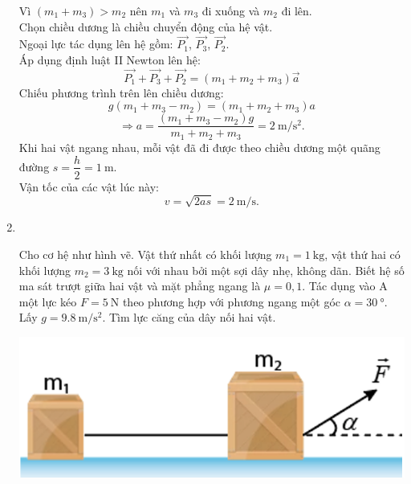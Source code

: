 \begin{enumerate}[label=\bfseries Bài \arabic*:]
{\begin{center}
\end{center}
Vì $\left(m_1+m_3\right)>m_2$ nên $m_1$ và $m_3$ đi xuống và $m_2$ đi lên.\\
Chọn chiều dương là chiều chuyển động của hệ vật.\\
Ngoại lực tác dụng lên hệ gồm: $\overrightarrow{P_1}$, $\overrightarrow{P_3}$, $\overrightarrow{P_2}$.\\
Áp dụng định luật II Newton lên hệ:
$$\overrightarrow{P_1}+\overrightarrow{P_3}+\overrightarrow{P_2}=\left(m_1+m_2+m_3\right)\vec{a}$$
Chiếu phương trình trên lên chiều dương:
$$g\left(m_1+m_3-m_2\right)=\left(m_1+m_2+m_3\right)a$$
$$\Rightarrow a=\dfrac{\left(m_1+m_3-m_2\right)g}{m_1+m_2+m_3}=\SI{2}{\meter/\second^2}.$$
Khi hai vật ngang nhau, mỗi vật đã đi được theo chiều dương một quãng đường $s=\dfrac{h}{2}=\SI{1}{\meter}$.\\
Vận tốc của các vật lúc này: 
$$v=\sqrt{2as}=\SI{2}{\meter/\second}.$$
}

\item{}\\
{Cho cơ hệ như hình vẽ. Vật thứ nhất có khối lượng $m_1=\SI{1}{\kilogram}$, vật thứ hai có khối lượng $m_2=\SI{3}{\kilogram}$ nối với nhau bởi một sợi dây nhẹ, không dãn. Biết hệ số ma sát trượt giữa hai vật và mặt phẳng ngang là $\mu=0,1$. Tác dụng vào A một lực kéo $F=\SI{5}{\newton}$ theo phương hợp với phương ngang một góc $\alpha=\SI{30}{\degree}$. Lấy $g =\SI{9.8}{\meter/\second^2}$. Tìm lực căng của dây nối hai vật.
	\begin{center}
		\includegraphics[width=0.3\linewidth]{../figs/VN10-2022-PH-TP021-P-3}
	\end{center}  

}
\end{enumerate}
